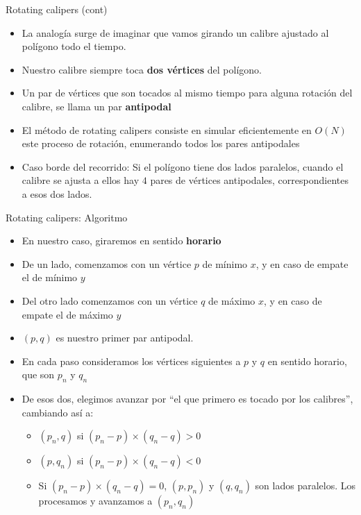 \documentclass[compress]{beamer}
\begin{document}
\begin{frame}{Rotating calipers (cont)}
    \begin{itemize}
        \item La analogía surge de imaginar que vamos girando un calibre ajustado al polígono todo el tiempo.
        \item Nuestro calibre siempre toca \textbf{dos vértices} del polígono.
        \item Un par de vértices que son tocados al mismo tiempo para alguna rotación del calibre, se llama un par \textbf{antipodal}
        \item El método de rotating calipers consiste en simular eficientemente en $O(N)$ este proceso de rotación, enumerando todos los pares antipodales
        \item Caso borde del recorrido: Si el polígono tiene dos lados paralelos, cuando el calibre se ajusta a ellos hay $4$ pares de vértices antipodales,
               correspondientes a esos dos lados.
    \end{itemize}
\end{frame}

\begin{frame}{Rotating calipers: Algoritmo}
    \begin{itemize}
        \item En nuestro caso, giraremos en sentido \textbf{horario}
        \item De un lado, comenzamos con un vértice $p$ de mínimo $x$, y en caso de empate el de mínimo $y$
        \item Del otro lado comenzamos con un vértice $q$ de máximo $x$, y en caso de empate el de máximo $y$
        \item $(p,q)$ es nuestro primer par antipodal.
        \item En cada paso consideramos los vértices siguientes a $p$ y $q$ en sentido horario, que son $p_n$ y $q_n$
        \item De esos dos, elegimos avanzar por ``el que primero es tocado por los calibres'', cambiando así a:
                \begin{itemize}
                    \item $(p_n, q)$ si $(p_n - p) \times (q_n - q) > 0$
                    \item $(p, q_n)$ si $(p_n - p) \times (q_n - q) < 0$
                    \item Si $(p_n - p) \times (q_n - q) = 0$, $(p, p_n)$ y $(q, q_n)$ son lados paralelos. Los procesamos y avanzamos a $(p_n, q_n)$
                \end{itemize}
    \end{itemize}
\end{frame}
\end{document}
